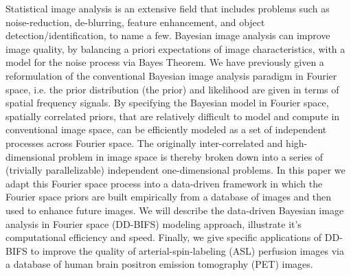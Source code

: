 
Statistical image analysis is an extensive field that includes problems such as noise-reduction, de-blurring, feature enhancement, and object detection/identification, to name a few. Bayesian image analysis can improve image quality, by balancing a priori expectations of image characteristics, with a model for the noise process via Bayes Theorem. We have previously given a reformulation of the conventional Bayesian image analysis paradigm in Fourier space, i.e. the prior distribution (the prior) and likelihood are given in terms of spatial frequency signals. By specifying the Bayesian model in Fourier space, spatially correlated priors, that are relatively difficult to model and compute in conventional image space, can be efficiently modeled as a set of independent processes across Fourier space. The originally inter-correlated and high-dimensional problem in image space is thereby broken down into a series of (trivially parallelizable) independent one-dimensional problems. In this paper we adapt this Fourier space process into a data-driven framework in which the Fourier space priors are built empirically from a database of images and then used to enhance future images. We will describe the data-driven Bayesian image analysis in Fourier space (DD-BIFS) modeling approach, illustrate it's computational efficiency and speed. Finally, we give specific applications of DD-BIFS to improve the quality of arterial-spin-labeling (ASL) perfusion images via a database of human brain positron emission tomography (PET) images.


